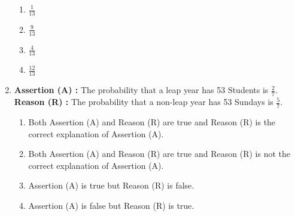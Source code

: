 \begin{enumerate}
			\begin{enumerate}
				\item $ \frac {1} {13} $
				\item $ \frac {9} {13} $
				\item $ \frac {4} {13} $
				\item $ \frac {12} {13} $
			\end{enumerate}
	\item \textbf{Assertion (A) : } The probability that a leap year has 53 Students is $ \frac {2} {7} $.\\
		\textbf{Reason (R) : } The probability that a non-leap year has 53 Sundays is $ \frac {5} {7} $.
		
			  \begin{enumerate}
				  \item Both Assertion (A) and Reason (R) are true and Reason (R) is the correct explanation of Assertion (A).
				  \item Both Assertion (A) and Reason (R) are true and Reason (R) is not the correct explanation of Assertion (A).
				  \item Assertion (A) is true but Reason (R) is false.
				  \item Assertion (A) is false but Reason (R) is true.
			  \end{enumerate}
		

\end{enumerate}

